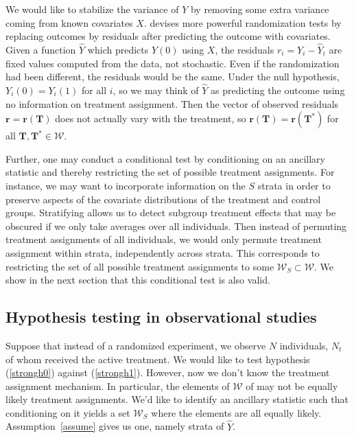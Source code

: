 \documentclass[12pt]{article}
\begin{document}
We would like to stabilize the variance of $Y$ by removing some extra variance coming from known covariates $X$.
\citet{rosenbaum_covariance_2002} devises more powerful randomization tests by replacing outcomes by residuals after predicting the outcome with covariates.
Given a function $\hat{Y}$ which predicts $Y(0)$ using $X$, the residuals $r_i = Y_i - \hat{Y}_i$ are fixed values computed from the data, not stochastic.
Even if the randomization had been different, the residuals would be the same.
Under the null hypothesis, $Y_i(0) = Y_i(1)$ for all $i$, so we may think of $\hat{Y}$ as predicting the outcome using no information on treatment assignment.
Then the vector of observed residuals $\mathbf{r} = \mathbf{r}(\mathbf{T})$ does not actually vary with the treatment, 
so $\mathbf{r}(\mathbf{T}) = \mathbf{r}(\mathbf{T}^*)$ for all $\mathbf{T}, \mathbf{T}^* \in \mathcal{W}$. 

Further, one may conduct a conditional test by conditioning on an ancillary statistic and thereby restricting the set of possible treatment assignments.
For instance, we may want to incorporate information on the $S$ strata in order to preserve aspects of the covariate distributions of the treatment and control groups.
Stratifying allows us to detect subgroup treatment effects that may be obscured if we only take averages over all individuals.
Then instead of permuting treatment assignments of all individuals, we would only permute treatment assignment within strata, independently across strata.
This corresponds to restricting the set of all possible treatment assignments to some $\mathcal{W}_S \subset \mathcal{W}$.
We show in the next section that this conditional test is also valid. 

\subsection{Hypothesis testing in observational studies}
Suppose that instead of a randomized experiment, we observe $N$ individuals, $N_t$ of whom received the active treatment.
We would like to test hypothesis (\ref{strongh0}) against (\ref{strongh1}).
However, now we don't know the treatment assignment mechanism.
In particular, the elements of $\mathcal{W}$ of may not be equally likely treatment assignments.
We'd like to identify an ancillary statistic such that conditioning on it yields a set $\mathcal{W}_S$ where the elements are all equally likely. 
Assumption~\ref{assume} gives us one, namely strata of $\hat{Y}$.
\end{document}
